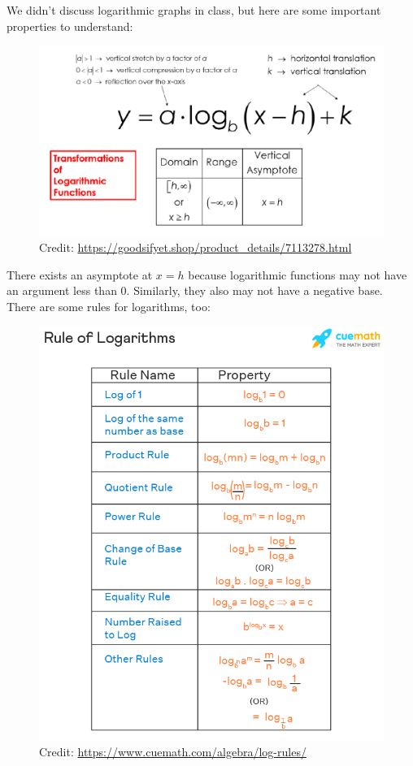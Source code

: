 \documentclass[12pt]{article}
\begin{document}
We didn't discuss logarithmic graphs in class, but here are some important properties to understand:\\

\begin{figure}[H]
	\centering
	\includegraphics[scale=.45]{loggraph.png}
	\caption{Credit: \url{https://goodsifyet.shop/product_details/7113278.html}}
\end{figure}

There exists an asymptote at \(x=h\) because logarithmic functions may not have an argument less than 0. Similarly, they also may not have a negative base.\\

There are some rules for logarithms, too:\\

\begin{figure}[H]
	\centering
	\includegraphics[scale=.52]{logrules.png}
	\caption{Credit: \url{https://www.cuemath.com/algebra/log-rules/}}
\end{figure}
\end{document}
